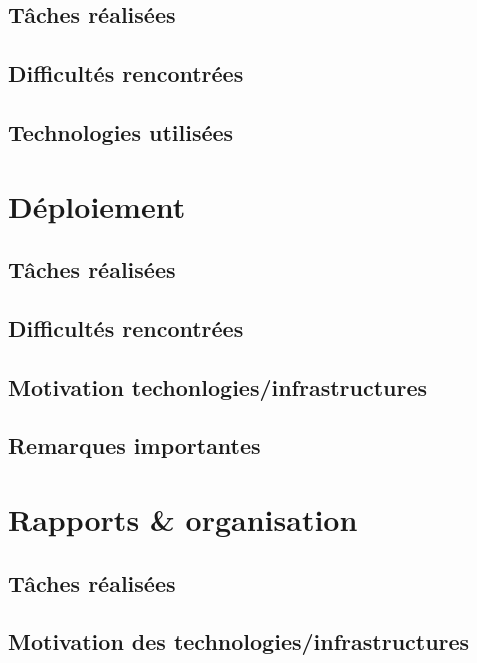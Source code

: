 \documentclass{article}
\begin{document}
    \subsection{Tâches réalisées} 
   
    \subsection{Difficultés rencontrées} 
    
    \subsection{Technologies utilisées}
   
\section{Déploiement}
    \subsection{Tâches réalisées} 
       
    \subsection{Difficultés rencontrées}
    
    \subsection{Motivation techonlogies/infrastructures}
   
    \subsection{Remarques importantes}
 
\section{Rapports \& organisation}

    \subsection{Tâches réalisées} 
   
    \subsection{Motivation des technologies/infrastructures}
   
\end{document}
